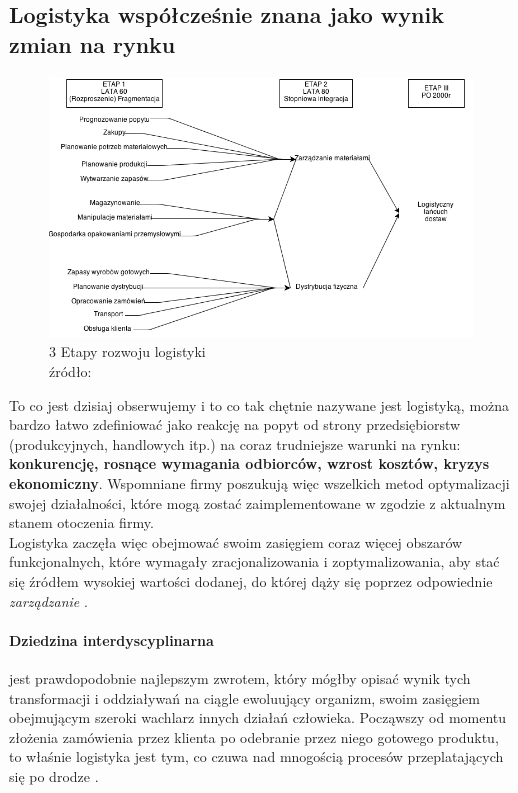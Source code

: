 	\subsection{Logistyka współcześnie znana jako wynik zmian na rynku}
		\begin{figure}[h]
			\centering
			\includegraphics[width=\textwidth]{images/etapy_rozwoju_logistyki}
			\caption[3 etapy rozwoju logistyki]{
				3 Etapy rozwoju logistyki \\
				źródło: \cite{logityka_w_przedsiebiorstwie_sarsjusz_wolski_skowronek}
			}
		\end{figure}
		To co jest dzisiaj obserwujemy i to co tak chętnie nazywane jest logistyką, 
		można bardzo łatwo zdefiniować jako reakcję na popyt od
		strony przedsiębiorstw (produkcyjnych, handlowych itp.) na coraz trudniejsze warunki na
		rynku: \textbf{konkurencję, rosnące wymagania odbiorców, wzrost kosztów, kryzys ekonomiczny}.
		Wspomniane firmy poszukują więc wszelkich metod optymalizacji swojej działalności, 
		które mogą zostać zaimplementowane w zgodzie z aktualnym stanem otoczenia firmy.\\
		
		Logistyka zaczęła więc obejmować swoim zasięgiem coraz więcej obszarów funkcjonalnych, które
		wymagały zracjonalizowania i zoptymalizowania, aby stać się źródłem wysokiej wartości dodanej, do której
		dąży się poprzez odpowiednie \emph{zarządzanie} \cite{logistyka_jako_dziedzina_wiedzy_cz1}.		
		
		\paragraph{Dziedzina interdyscyplinarna} jest prawdopodobnie najlepszym zwrotem, 
		który mógłby opisać wynik tych transformacji i oddziaływań na ciągle ewoluujący organizm, swoim
		zasięgiem obejmującym szeroki wachlarz innych działań człowieka. Począwszy od momentu złożenia
		zamówienia przez klienta po odebranie przez niego gotowego produktu, to właśnie logistyka jest
		tym, co czuwa nad mnogością procesów przeplatających się po drodze \cite{logistyka_jako_dziedzina_wiedzy_cz2}.	
		
